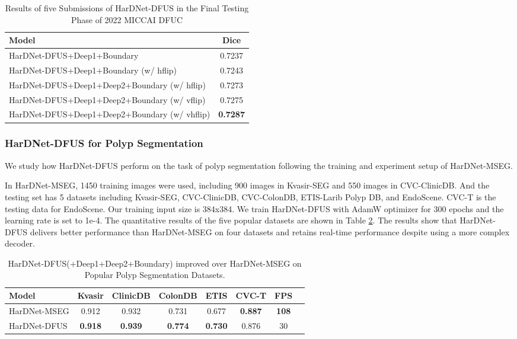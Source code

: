 \documentclass[runningheads]{llncs}
\begin{document}
\begin{table}[!ht]
\centering
\caption{Results of five Submissions of HarDNet-DFUS in the Final Testing Phase of 2022 MICCAI DFUC\label{tab:testing}}
\begin{tabular}{l|c}
\hline \hline
{ Model } & { Dice }  \\ \hline \hline
{ HarDNet-DFUS+Deep1+Boundary }                & 0.7237  \\ \hline
{ HarDNet-DFUS+Deep1+Boundary (w/ hflip) }     & 0.7243  \\ \hline
{ HarDNet-DFUS+Deep1+Deep2+Boundary (w/ hflip) }  & 0.7273  \\ \hline
{ HarDNet-DFUS+Deep1+Deep2+Boundary (w/ vflip) }  & 0.7275  \\ \hline
{ HarDNet-DFUS+Deep1+Deep2+Boundary (w/ vhflip) } & { \bfseries 0.7287}  \\ \hline
\end{tabular}
\end{table}

\subsubsection{HarDNet-DFUS for Polyp Segmentation}

We study how HarDNet-DFUS perform on the task of polyp segmentation following the training and experiment setup of HarDNet-MSEG\cite{HarDNet-MSEG}.

In HarDNet-MSEG\cite{HarDNet-MSEG}, 1450 training images were used,
including 900 images in Kvasir-SEG and 550 images in CVC-ClinicDB.
And the testing set has 5 datasets including Kvasir-SEG, CVC-ClinicDB, CVC-ColonDB, ETIS-Larib Polyp DB, and EndoScene.
CVC-T is the testing data for EndoScene.
Our training input size is 384x384.
We train HarDNet-DFUS with AdamW optimizer for 300 epochs and the learning rate is set to 1e-4.
The quantitative results of the five popular datasets are shown in Table \ref{tab:polyp}.
The results show that HarDNet-DFUS delivers better performance than HarDNet-MSEG on four datasets and retains real-time performance
despite using a more complex decoder. 
\begin{table}
\centering
\caption{HarDNet-DFUS(+Deep1+Deep2+Boundary) improved over HarDNet-MSEG on Popular Polyp Segmentation Datasets. \label{tab:polyp}}
\begin{tabular}{l|c|c|c|c|c|c|c}
\hline \hline
Model              & Kvasir     & ClinicDB             & ColonDB              & ETIS                 & CVC-T   &FPS   \\ \hline \hline
{ HarDNet-MSEG }   & 0.912      & 0.932                & 0.731                & 0.677                & { \bfseries 0.887} & { \bfseries 108} \\ \hline
{ HarDNet-DFUS}    & { \bfseries 0.918}      & { \bfseries 0.939}   & { \bfseries 0.774}   & { \bfseries 0.730}   & 0.876   & 30 \\ \hline
                                  
\end{tabular}
\end{table}
\end{document}
